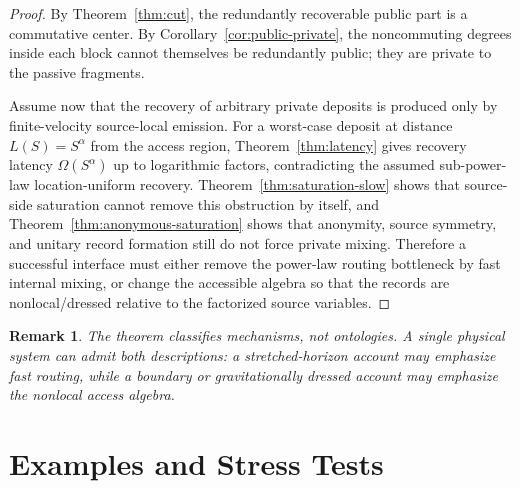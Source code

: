 \documentclass[11pt]{article}
\newtheorem{remark}{Remark}
\begin{document}
\begin{proof}
By Theorem~\ref{thm:cut}, the redundantly recoverable public part is a
commutative center.  By Corollary~\ref{cor:public-private}, the
noncommuting degrees inside each block cannot themselves be redundantly
public; they are private to the passive fragments.

Assume now that the recovery of arbitrary private deposits is produced
only by finite-velocity source-local emission.  For a worst-case deposit
at distance $L(S)=S^\alpha$ from the access region,
Theorem~\ref{thm:latency} gives recovery latency
$\Omega(S^\alpha)$ up to logarithmic factors, contradicting the assumed
sub-power-law location-uniform recovery.  Theorem~\ref{thm:saturation-slow}
shows that source-side saturation cannot remove this obstruction by
itself, and Theorem~\ref{thm:anonymous-saturation} shows that anonymity,
source symmetry, and unitary record formation still do not force private
mixing.  Therefore a successful interface must either remove the
power-law routing bottleneck by fast internal mixing, or change the
accessible algebra so that the records are nonlocal/dressed relative to
the factorized source variables.
\end{proof}

\begin{remark}
The theorem classifies mechanisms, not ontologies.  A single physical
system can admit both descriptions: a stretched-horizon account may
emphasize fast routing, while a boundary or gravitationally dressed
account may emphasize the nonlocal access algebra.
\end{remark}

\section{Examples and Stress Tests}
\end{document}
